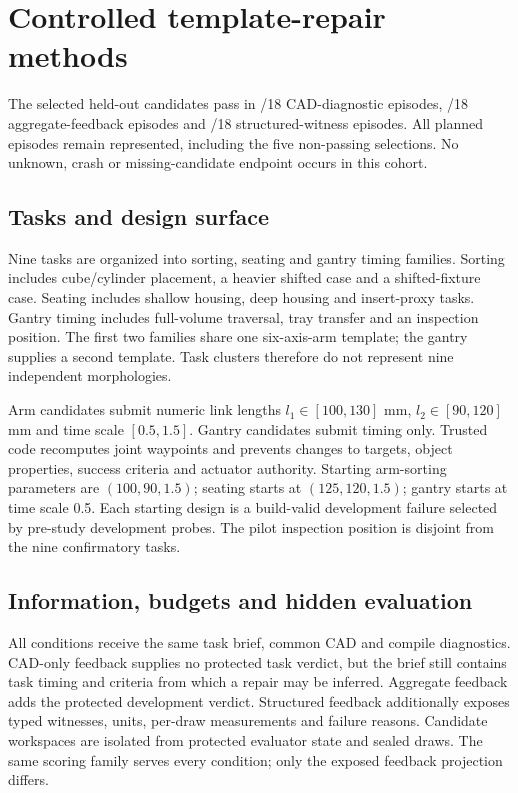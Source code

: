 \section{Controlled template-repair methods}
The selected held-out candidates pass in \EOneCadPass{}/18 CAD-diagnostic episodes, \EOneAggregatePass{}/18 aggregate-feedback episodes and \EOneStructuredPass{}/18 structured-witness episodes. All planned episodes remain represented, including the five non-passing selections. No unknown, crash or missing-candidate endpoint occurs in this cohort.
\subsection{Tasks and design surface}
Nine tasks are organized into sorting, seating and gantry timing families. Sorting includes cube/cylinder placement, a heavier shifted case and a shifted-fixture case. Seating includes shallow housing, deep housing and insert-proxy tasks. Gantry timing includes full-volume traversal, tray transfer and an inspection position. The first two families share one six-axis-arm template; the gantry supplies a second template. Task clusters therefore do not represent nine independent morphologies.

Arm candidates submit numeric link lengths $l_1\in[100,130]$ mm, $l_2\in[90,120]$ mm and time scale $[0.5,1.5]$. Gantry candidates submit timing only. Trusted code recomputes joint waypoints and prevents changes to targets, object properties, success criteria and actuator authority. Starting arm-sorting parameters are $(100,90,1.5)$; seating starts at $(125,120,1.5)$; gantry starts at time scale 0.5. Each starting design is a build-valid development failure selected by pre-study development probes. The pilot inspection position is disjoint from the nine confirmatory tasks.

\subsection{Information, budgets and hidden evaluation}
All conditions receive the same task brief, common CAD and compile diagnostics. CAD-only feedback supplies no protected task verdict, but the brief still contains task timing and criteria from which a repair may be inferred. Aggregate feedback adds the protected development verdict. Structured feedback additionally exposes typed witnesses, units, per-draw measurements and failure reasons. Candidate workspaces are isolated from protected evaluator state and sealed draws. The same scoring family serves every condition; only the exposed feedback projection differs.

